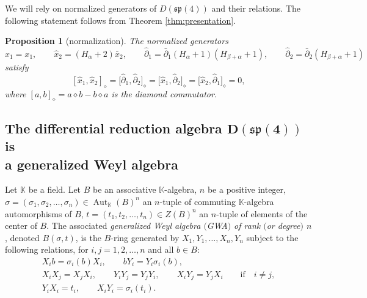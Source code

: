 \documentclass[10pt,a4paper]{amsart}
\numberwithin{equation}{section}
\newtheorem{Proposition}[Theorem]{Proposition}
 { \theoremstyle{definition}
\newtheorem{Definition}[Theorem]{Definition}
\newtheorem{Note}[Theorem]{Note}
\newtheorem{Example}[Theorem]{Example}
\newtheorem{Remark}[Theorem]{Remark} }
\DeclareMathOperator{\Aut}{Aut}
\begin{document}
We will rely on normalized generators of $D(\mathfrak{sp}(4))$ and their relations. The following statement follows from Theorem \ref{thm:presentation}.
\begin{Proposition}[normalization]\label{Prop:Normalized-generators-relations}
	The normalized generators
	\[
		\hat x_1 = x_1,\qquad \hat x_2=(H_\alpha+2)\bar x_2,\qquad
		\hat \partial_1 = \bar \partial_1(H_\alpha+1)(H_{\beta+\alpha}+1),\qquad \hat \partial_2=\bar \partial_2(H_{\beta+\alpha}+1)
	\]
	satisfy
	\begin{equation}\label{eq:hat-relations}
		[\hat x_1,\hat x_2]_\diamond = \bigl[\hat \partial_1,\hat \partial_2\bigr]_\diamond =\bigl[\hat x_1, \hat \partial_2\bigr]_\diamond = \bigl[\hat x_2, \hat \partial_1\bigr]_\diamond=0,
	\end{equation}
	where $[a,b]_\diamond = a\diamond b-b\diamond a$ is the diamond commutator.
\end{Proposition}

\subsection[The differential reduction algebra D(sp(4)) is a generalized Weyl algebra]{The differential reduction algebra $\boldsymbol{D(\mathfrak{sp}(4))}$ is\\ a generalized Weyl algebra}\label{subsec:GWAsp4}
\begin{Definition}[GWA]\label{def:GWA}
	Let $\mathbb{K}$ be a field.
	Let $B$ be an associative $\mathbb{K}$-algebra, $n$ be a positive integer, $\sigma=(\sigma_1,\sigma_2,\dots,\sigma_n)\in\Aut_\mathbb{K}(B)^n$ an $n$-tuple of commuting $\mathbb{K}$-algebra automorphisms of $B$, $t=(t_1,t_2,\dots,t_n)\in Z(B)^n$ an $n$-tuple of elements of the center of $B$. The associated \emph{generalized Weyl algebra $($GWA$)$ of rank $($or degree$)$ $n$}, denoted $B(\sigma,t)$, is the $B$-ring generated by $X_1, Y_1, \dots, X_n, Y_n$ subject to the following relations, for $i,j=1,2,\dots,n$ and all $b\in B$:
	\begin{subequations}\label{eq:GWA-rels}
		\begin{gather}%
			\label{eq:GWA-rels1}
			X_ib=\sigma_i(b)X_i,\qquad bY_i=Y_i\sigma_i(b),\\
			\label{eq:GWA-rels2}
			X_iX_j=X_jX_i,\qquad Y_iY_j=Y_jY_i,\qquad
			X_iY_j=Y_jX_i \qquad\text{if}\quad i\neq j,\\
			Y_iX_i=t_i,\qquad X_iY_i=\sigma_i(t_i).\nonumber
		\end{gather}
	\end{subequations}
\end{Definition}
\end{document}
